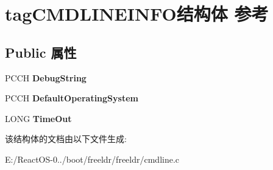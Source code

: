 \hypertarget{structtag_c_m_d_l_i_n_e_i_n_f_o}{}\section{tag\+C\+M\+D\+L\+I\+N\+E\+I\+N\+F\+O结构体 参考}
\label{structtag_c_m_d_l_i_n_e_i_n_f_o}
\subsection*{Public 属性}
\begin{DoxyCompactItemize}
\item 
\mbox{\label{structtag_c_m_d_l_i_n_e_i_n_f_o_a9ebe2dba707143a19b95aec15eb7c3d3}} 
P\+C\+CH {\bfseries Debug\+String}
\item 
\mbox{\label{structtag_c_m_d_l_i_n_e_i_n_f_o_a85eaa0db01a391c202b70c64da19805f}} 
P\+C\+CH {\bfseries Default\+Operating\+System}
\item 
\mbox{\label{structtag_c_m_d_l_i_n_e_i_n_f_o_a609e68ee9e426c2bd2fcbb7076ac9967}} 
L\+O\+NG {\bfseries Time\+Out}
\end{DoxyCompactItemize}


该结构体的文档由以下文件生成\+:\begin{DoxyCompactItemize}
\item 
E\+:/\+React\+O\+S-\/0../boot/freeldr/freeldr/cmdline.\+c\end{DoxyCompactItemize}
